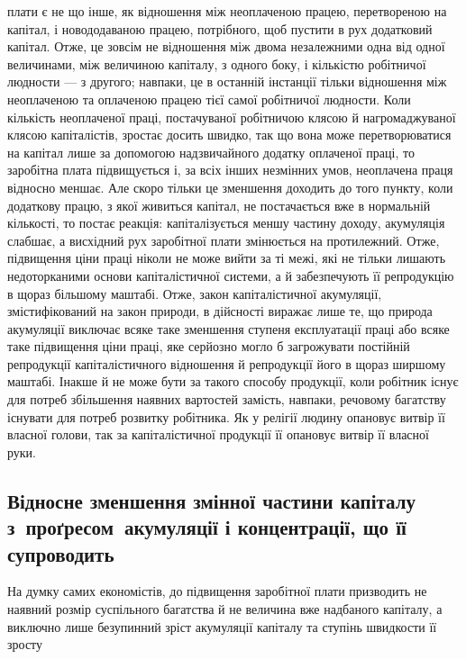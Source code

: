 \parcont{}  %
плати є не що інше, як відношення між неоплаченою працею,
перетвореною на капітал, і новододаваною працею, потрібного, щоб
пустити в рух додатковий капітал. Отже, це зовсім не відношення
між двома незалежними одна від одної величинами, між величиною
капіталу, з одного боку, і кількістю робітничої людности —
з другого; навпаки, це в останній інстанції тільки відношення
між неоплаченою та оплаченою працею тієї самої робітничої людности.
Коли кількість неоплаченої праці, постачуваної робітничою
клясою й нагромаджуваної клясою капіталістів, зростає
досить швидко, так що вона може перетворюватися на капітал
лише за допомогою надзвичайного додатку оплаченої праці, то
заробітна плата підвищується і, за всіх інших незмінних умов,
неоплачена праця відносно меншає. Але скоро тільки це зменшення
доходить до того пункту, коли додаткову працю, з якої
живиться капітал, не постачається вже в нормальній кількості,
то постає реакція: капіталізується меншу частину доходу, акумуляція
слабшає, а висхідний рух заробітної плати змінюється
на протилежний. Отже, підвищення ціни праці ніколи не може
вийти за ті межі, які не тільки лишають недоторканими основи
капіталістичної системи, а й забезпечують її репродукцію в
щораз більшому маштабі. Отже, закон капіталістичної акумуляції,
змістифікований на закон природи, в дійсності виражає
лише те, що природа акумуляції виключає всяке таке зменшення
ступеня експлуатації праці або всяке таке підвищення ціни
праці, яке серйозно могло б загрожувати постійній репродукції
капіталістичного відношення й репродукції його в щораз ширшому
маштабі. Інакше й не може бути за такого способу продукції,
коли робітник існує для потреб збільшення наявних вартостей
замість, навпаки, речовому багатству існувати для потреб
розвитку робітника. Як у релігії людину опановує витвір її власної
голови, так за капіталістичної продукції її опановує витвір
її власної руки.

\subsection{Відносне зменшення змінної частини капіталу
з~проґресом~акумуляції і концентрації, що її супроводить}

На думку самих економістів, до підвищення заробітної плати
призводить не наявний розмір суспільного багатства й не величина
вже надбаного капіталу, а виключно лише безупинний
зріст акумуляції капіталу та ступінь швидкости її зросту
\parbreak{}  %
